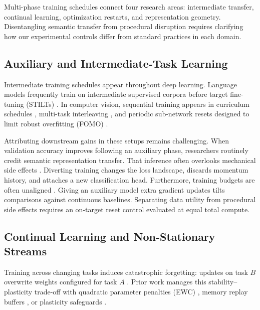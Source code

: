 \documentclass[sn-mathphys,Numbered]{sn-jnl}
\begin{document}
Multi-phase training schedules connect four research areas: intermediate transfer, continual learning, optimization restarts, and representation geometry. Disentangling semantic transfer from procedural disruption requires clarifying how our experimental controls differ from standard practices in each domain.

\subsection{Auxiliary and Intermediate-Task Learning}\label{subsec:related_auxiliary}

Intermediate training schedules appear throughout deep learning. Language models frequently train on intermediate supervised corpora before target fine-tuning (STILTs) \cite{phang2018stilts,pruksachatkun2020intermediate,chang2021rethinking}. In computer vision, sequential training appears in curriculum schedules \cite{davidson2020sequential}, multi-task interleaving \cite{mayo2023multitask}, and periodic sub-network resets designed to limit robust overfitting (FOMO) \cite{ramkumar2024fomo}.

Attributing downstream gains in these setups remains challenging. When validation accuracy improves following an auxiliary phase, researchers routinely credit semantic representation transfer. That inference often overlooks mechanical side effects \cite{menco2026original}. Diverting training changes the loss landscape, discards momentum history, and attaches a new classification head. Furthermore, training budgets are often unaligned \cite{mitchell2025unlearning}. Giving an auxiliary model extra gradient updates tilts comparisons against continuous baselines. Separating data utility from procedural side effects requires an on-target reset control evaluated at equal total compute.

\subsection{Continual Learning and Non-Stationary Streams}\label{subsec:related_continual}

Training across changing tasks induces catastrophic forgetting: updates on task $B$ overwrite weights configured for task $A$ \cite{french1999catastrophic,kirkpatrick2017overcoming,lopezpaz2017gem}. Prior work manages this stability--plasticity trade-off with quadratic parameter penalties (EWC) \cite{kirkpatrick2017overcoming}, memory replay buffers \cite{lopezpaz2017gem,toneva2019empirical}, or plasticity safeguards \cite{dohare2024continual,lyle2023plasticity}.
\end{document}
